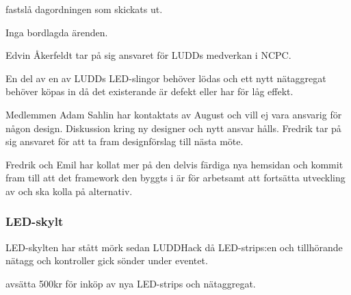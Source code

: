 \documentclass{protokoll}
\begin{document}
\newpage  


\begin{beslut}
     \att fastslå dagordningen som skickats ut.
\end{beslut}

Inga bordlagda ärenden.

Edvin Åkerfeldt tar på sig ansvaret för LUDDs medverkan i NCPC.

En del av en av LUDDs LED-slingor behöver lödas och ett nytt nätaggregat behöver köpas in då det existerande är defekt eller har för låg effekt. 

Medlemmen Adam Sahlin har kontaktats av August och vill ej vara ansvarig för någon design. Diskussion kring ny designer och nytt ansvar hålls. 
Fredrik tar på sig ansvaret för att ta fram designförslag till nästa möte. 

Fredrik och Emil har kollat mer på den delvis färdiga nya hemsidan och kommit fram till att det framework den byggts i är för arbetsamt att fortsätta utveckling av och ska kolla på alternativ.

\subsubsection{LED-skylt}
LED-skylten har stått mörk sedan LUDDHack då LED-strips:en och tillhörande nätagg och kontroller gick sönder under eventet. 
\begin{beslut}
    \att avsätta 500kr för inköp av nya LED-strips och nätaggregat.
\end{beslut}
\end{document}
